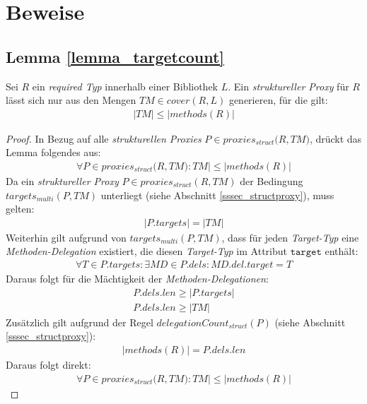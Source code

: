 \chapter{Beweise}\label{app_proofs}
\section{Lemma \ref{lemma_targetcount}}
\begin{lemma*}\label{lemma_targetcount}
Sei $R$ ein \emph{required Typ} innerhalb einer Bibliothek $L$. 
Ein \emph{struktureller Proxy} für $R$ lässt sich nur aus den Mengen $\mathit{TM} \in \mathit{cover(R,L)}$ generieren, für die gilt:
\begin{gather*}
|\mathit{TM}| \leq |\mathit{methods(R)}|
\end{gather*}
\end{lemma*}
\begin{proof}
In Bezug auf alle \emph{strukturellen Proxies} $P \in \mathit{proxies_{struct}(R,TM})$, drückt das Lemma folgendes aus:
\begin{gather*}
\forall \mathit{P} \in \mathit{proxies_{struct}(R,TM}):\mathit{TM}| \leq |\mathit{methods(R)}|
\end{gather*}
\noindent
Da ein \emph{struktureller Proxy} $P \in \mathit{proxies_{struct}(R,TM)}$ der Bedingung $\mathit{targets_{multi}(P,TM)}$ unterliegt (siehe Abschnitt \ref{sssec_structproxy}), muss gelten:
\begin{gather*}
|\mathit{P.targets}| = |\mathit{TM}|
\end{gather*}
Weiterhin gilt aufgrund von $\mathit{targets_{multi}(P,TM)}$, dass für jeden \emph{Target-Typ} eine \emph{Methoden-Delegation} existiert, die diesen \emph{Target-Typ} im Attribut $\texttt{target}$ enthält:
\begin{gather*}
\forall \mathit{T} \in \mathit{P.targets}: \exists \mathit{MD} \in \mathit{P.dels}:\mathit{MD.del.target} = T
\end{gather*}
Daraus folgt für die Mächtigkeit der \emph{Methoden-Delegationen}:
\begin{gather*}
\mathit{P.dels.len} \geq |\mathit{P.targets}|\\ \mathit{P.dels.len} \geq |\mathit{TM}|
\end{gather*}
\noindent
Zusätzlich gilt aufgrund der Regel $\mathit{delegationCount_{struct}(P)}$ (siehe Abschnitt \ref{sssec_structproxy}):
\begin{gather*}
|\mathit{methods(R)}| = \mathit{P.dels.len}
\end{gather*}
Daraus folgt direkt:
\begin{gather*}
\forall \mathit{P} \in \mathit{proxies_{struct}(R,TM}):\mathit{TM}| \leq |\mathit{methods(R)}|
\end{gather*}



\end{proof}
